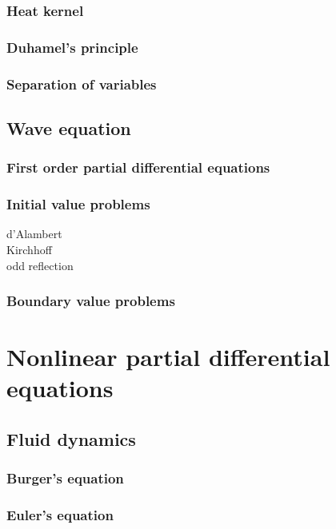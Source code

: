\documentclass{../note}
\begin{document}
\section{Heat kernel}
\section{Duhamel's principle}
\section{Separation of variables}






\chapter{Wave equation}
\section{First order partial differential equations}
\section{Initial value problems}
d'Alambert\\
Kirchhoff\\
odd reflection

\section{Boundary value problems}







\part{Nonlinear partial differential equations}

\chapter{Fluid dynamics}
\section{Burger's equation}
\section{Euler's equation}
\end{document}
